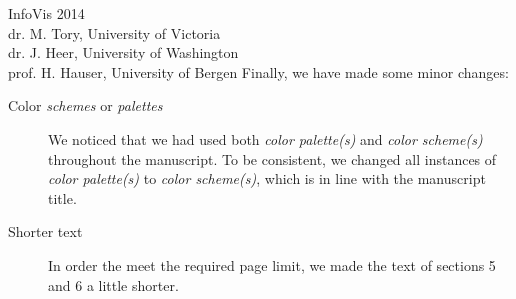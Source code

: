 \documentclass{letter}
\begin{document}
\begin{letter}{InfoVis 2014 \\ dr. M. Tory, University of Victoria \\ dr. J. Heer, University of Washington \\ prof. H. Hauser, University of Bergen}
Finally, we have made some minor changes:
\begin{description}
\item[Color \textit{schemes} or \textit{palettes}] We noticed that we had used both \textit{color palette(s)} and \textit{color scheme(s)} throughout the manuscript. To be consistent, we changed all instances of \textit{color palette(s)} to \textit{color scheme(s)}, which is in line with the manuscript title.
\item[Shorter text] In order the meet the required page limit, we made the text of sections 5 and 6 a little shorter.
\end{description}








\end{letter}
\end{document}
